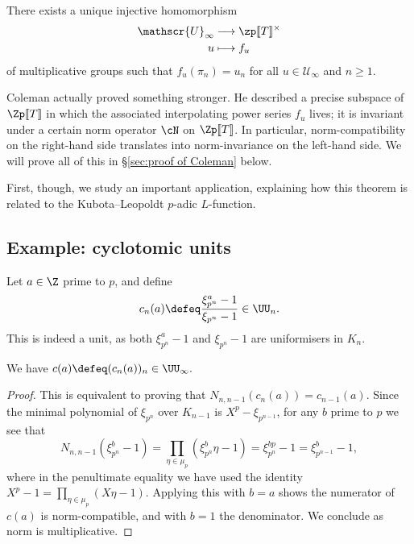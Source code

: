 \documentclass[a4paper,10pt, english, reqno]{smfart}
\newcommand{\lsem}{[\! [}
\newcommand{\rsem}{]\! ]}
\numberwithin{equation}{section}
\begin{document}
\begin{theorem} [Coleman] \label{thm:coleman power series}
There exists a unique injective homomorphism
\begin{align*}
\mathscr{U}_\infty &\longrightarrow \zp\lsem T\rsem^\times  \\
u &\longmapsto f_u
\end{align*}
of multiplicative groups such that $f_u(\pi_n) = u_n$ for all $u \in \mathscr{U}_\infty$ and $n\geq 1$.
\end{theorem}


Coleman actually proved something stronger. He described a precise subspace of $\Zp\lsem T\rsem$ in which the associated interpolating power series $f_u$ lives; it is invariant under a certain norm operator $\cN$ on $\Zp\lsem T\rsem$. In particular, norm-compatibility on the right-hand side translates into norm-invariance on the left-hand side. We will prove all of this in \S\ref{sec:proof of Coleman} below.


First, though, we study an important application, explaining how this theorem is related to the Kubota--Leopoldt $p$-adic $L$-function.



\subsection{Example: cyclotomic units} \label{sec:cyclo units coleman}

Let $a \in \Z$ prime to $p$, and define
\[c_n(a) \defeq \frac{\xi_{p^n}^a -1}{\xi_{p^n} - 1} \in \UU_n.\]
 This is indeed a unit, as both $\xi_{p^n}^a -1$ and $\xi_{p^n} - 1$ are uniformisers in $K_n$.

\begin{lemma}
We have $c(a) \defeq (c_n(a))_n \in \UU_\infty.$
\end{lemma}

\begin{proof}
	This is equivalent to proving that $N_{n,n-1}(c_n(a)) = c_{n-1}(a).$ Since the minimal polynomial of $\xi_{p^n}$ over $K_{n-1}$ is $X^p - \xi_{p^{n-1}}$, for any $b$ prime to $p$ we see that
	\begin{equation*}N_{n,n-1}(\xi_{p^n}^b - 1) = \prod_{\eta \in \mu_p}(\xi_{p^n}^b \eta - 1)
		= \xi_{p^n}^{bp} - 1 = \xi_{p^{n-1}}^b -1,
	\end{equation*}
	where in the penultimate equality we have used the identity $X^p - 1 = \prod_{\eta \in \mu_p} (X \eta - 1)$. Applying this with $b=a$ shows the numerator of $c(a)$ is norm-compatible, and with $b=1$ the denominator. We conclude as norm is multiplicative.
\end{proof}
\end{document}
